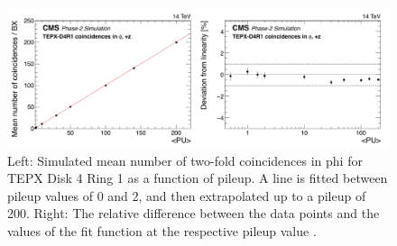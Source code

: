\begin{figure}[H]
  \centering
  \includegraphics[width=1\columnwidth]{ashish_thesis/michigan_4.png}
  \caption[TEPX two-fold coincidences linear fit for Disk 4 Ring 1]{\onehalfspacing Left: Simulated mean number of two-fold coincidences in phi for TEPX Disk 4 Ring 1 as a function of pileup. A line is fitted between pileup values of 0 and 2, and then extrapolated up to a pileup of 200. Right: The relative difference between the data points and the values of the fit function at the respective pileup value \cite{Collaboration:275907420}.}
  \label{fig:CMS_4207}
\end{figure}



